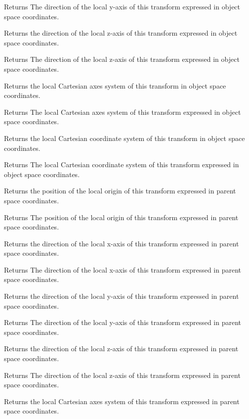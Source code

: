 \begin{DoxyReturn}{Returns}
The direction of the local y-\/axis of this transform expressed in object space coordinates.
\end{DoxyReturn}
Returns the direction of the local z-\/axis of this transform expressed in object space coordinates.

\begin{DoxyReturn}{Returns}
The direction of the local z-\/axis of this transform expressed in object space coordinates.
\end{DoxyReturn}
Returns the local Cartesian axes system of this transform in object space coordinates.

\begin{DoxyReturn}{Returns}
The local Cartesian axes system of this transform expressed in object space coordinates.
\end{DoxyReturn}
Returns the local Cartesian coordinate system of this transform in object space coordinates.

\begin{DoxyReturn}{Returns}
The local Cartesian coordinate system of this transform expressed in object space coordinates.
\end{DoxyReturn}
Returns the position of the local origin of this transform expressed in parent space coordinates.

\begin{DoxyReturn}{Returns}
The position of the local origin of this transform expressed in parent space coordinates.
\end{DoxyReturn}
Returns the direction of the local x-\/axis of this transform expressed in parent space coordinates.

\begin{DoxyReturn}{Returns}
The direction of the local x-\/axis of this transform expressed in parent space coordinates.
\end{DoxyReturn}
Returns the direction of the local y-\/axis of this transform expressed in parent space coordinates.

\begin{DoxyReturn}{Returns}
The direction of the local y-\/axis of this transform expressed in parent space coordinates.
\end{DoxyReturn}
Returns the direction of the local z-\/axis of this transform expressed in parent space coordinates.

\begin{DoxyReturn}{Returns}
The direction of the local z-\/axis of this transform expressed in parent space coordinates.
\end{DoxyReturn}
Returns the local Cartesian axes system of this transform expressed in parent space coordinates.

